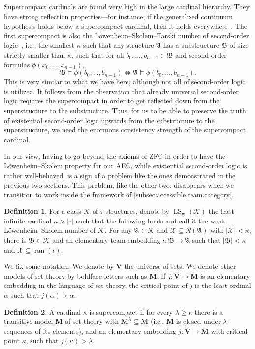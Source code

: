 \documentclass[a4paper]{amsart}
\theoremstyle{definition}
\newtheorem{definition}{Definition}[section]
\theoremstyle{remark}
\newcommand{\A}{\mathcal{A}}
\newcommand{\B}{\mathcal{B}}
\DeclareMathOperator{\ran}{ran}
\newcommand{\K}{\mathcal{K}}
\newcommand{\R}{\mathcal{R}}
\newcommand{\X}{\mathcal{X}}
\newcommand{\V}{\mathbf{V}}
\DeclareMathOperator{\LS}{LS}
\theoremstyle{definition}
\renewcommand{\A}{\mathfrak{A}}
\renewcommand{\B}{\mathfrak{B}}
\newcommand{\bM}{\mathbf{M}}
\begin{document}
Supercompact cardinals are found very high in the large cardinal hierarchy. They have strong reflection properties---for instance, if the generalized continuum hypothesis holds below a supercompact cardinal, then it holds everywhere~\cite{CODY2014620}. The first supercompact is also the Löwenheim--Skolem--Tarski number of second-order logic~\cite{magidor2011lowenheim}, i.e., the smallest $\kappa$ such that any structure $\A$ has a substructure $\B$ of size strictly smaller than $\kappa$, such that for all $b_0,\dots,b_{n-1}\in\B$ and second-order formulas $\phi(x_0,\dots,x_{n-1})$,
\[
    \B\models\phi(b_0,\dots,b_{n-1}) \iff \A\models\phi(b_0,\dots,b_{n-1}).
\]
This is very similar to what we have here, although not all of second-order logic is utilized. It follows from the observation that already universal second-order logic requires the supercompact in order to get reflected down from the superstructure to the substructure. Thus, for us to be able to preserve the truth of existential second-order logic upwards from the substructure to the superstructure, we need the enormous consistency strength of the supercompact cardinal.

In our view, having to go beyond the axioms of ZFC in order to have the Löwenheim--Skolem property for our AEC, while existential second-order logic is rather well-behaved, is a sign of a problem like the ones demonstrated in the previous two sections. This problem, like the other two, disappears when we transition to work inside the framework of \cref{subsec:accessible.team.category}.



\newcommand{\WLS}{\LS_{\mathrm{w}}}
\begin{definition}
    For a class $\K$ of $\tau$-structures, denote by $\WLS(\K)$ the least infinite cardinal $\kappa>|\tau|$ such that the following holds and call it the weak Löwenheim--Skolem number of $\K$.
    For any $\A\in\K$ and $\X\subseteq\R(\A)$ with $|\X|<\kappa$, there is $\B\in\K$ and an elementary team embedding $\iota\colon\B\to\A$ such that $|\B|<\kappa$ and $\X\subseteq\ran(\iota)$.
\end{definition}

We fix some notation. We denote by $\V$ the universe of sets. We denote other models of set theory by boldface letters such as $\bM$. If $j\colon\V\to\bM$ is an elementary embedding in the language of set theory, the critical point of $j$ is the least ordinal $\alpha$ such that $j(\alpha)>\alpha$.

\begin{definition}
    A cardinal $\kappa$ is supercompact if for every $\lambda\geq\kappa$ there is a transitive model $\bM$ of set theory with $\bM^\lambda\subseteq\bM$ (i.e., $\bM$ is closed under $\lambda$-sequences of its elements), and an elementary embedding $j\colon\V\to\bM$ with critical point $\kappa$, such that $j(\kappa)>\lambda$.
\end{definition}
\end{document}
